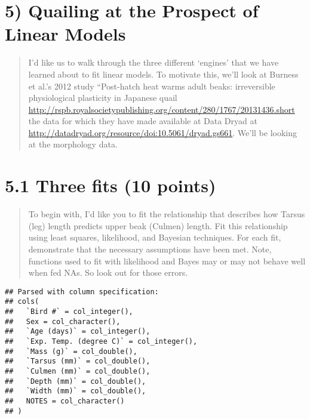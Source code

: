 \documentclass[]{article}
\newenvironment{Shaded}{\begin{snugshade}}{\end{snugshade}}
\newcommand{\KeywordTok}[1]{\textcolor[rgb]{0.13,0.29,0.53}{\textbf{#1}}}
\newcommand{\DataTypeTok}[1]{\textcolor[rgb]{0.13,0.29,0.53}{#1}}
\newcommand{\StringTok}[1]{\textcolor[rgb]{0.31,0.60,0.02}{#1}}
\newcommand{\OtherTok}[1]{\textcolor[rgb]{0.56,0.35,0.01}{#1}}
\newcommand{\OperatorTok}[1]{\textcolor[rgb]{0.81,0.36,0.00}{\textbf{#1}}}
\newcommand{\NormalTok}[1]{#1}
\begin{document}
\section{5) Quailing at the Prospect of Linear
Models}\label{quailing-at-the-prospect-of-linear-models}

\begin{quote}
I'd like us to walk through the three different `engines' that we have
learned about to fit linear models. To motivate this, we'll look at
Burness et al.'s 2012 study ``Post-hatch heat warms adult beaks:
irreversible physiological plasticity in Japanese quail
\url{http://rspb.royalsocietypublishing.org/content/280/1767/20131436.short}
the data for which they have made available at Data Dryad at
\url{http://datadryad.org/resource/doi:10.5061/dryad.gs661}. We'll be
looking at the morphology data.
\end{quote}

\section{5.1 Three fits (10 points)}\label{three-fits-10-points}

\begin{quote}
To begin with, I'd like you to fit the relationship that describes how
Tarsus (leg) length predicts upper beak (Culmen) length. Fit this
relationship using least squares, likelihood, and Bayesian techniques.
For each fit, demonstrate that the necessary assumptions have been met.
Note, functions used to fit with likelihood and Bayes may or may not
behave well when fed NAs. So look out for those errors.
\end{quote}

\begin{Shaded}
\end{Shaded}

\begin{verbatim}
## Parsed with column specification:
## cols(
##   `Bird #` = col_integer(),
##   Sex = col_character(),
##   `Age (days)` = col_integer(),
##   `Exp. Temp. (degree C)` = col_integer(),
##   `Mass (g)` = col_double(),
##   `Tarsus (mm)` = col_double(),
##   `Culmen (mm)` = col_double(),
##   `Depth (mm)` = col_double(),
##   `Width (mm)` = col_double(),
##   NOTES = col_character()
## )
\end{verbatim}
\end{document}
